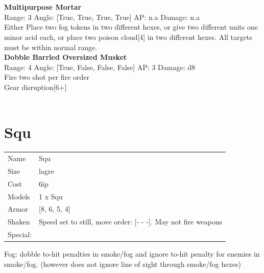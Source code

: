 \ \\

\ \\
{\bf Multipurpose Mortar } \\



Range: 3  Angle: [True, True, True, True] AP: n.a Damage: n.a \\
Either Place two fog tokens in two different hexes, or give two different units one minor acid each, or place two poison cloud[4] in two different hexes. All targets must be within normal range.\\ 




{\bf Dobble Barrled Oversized Musket } \\



Range: 4  Angle: [True, False, False, False] AP: 3 Damage: d8 \\
Fire two shot per fire order\\ 
Gear disruption[6+]\\ 




 
\ \\













\clearpage

\section{ Squ }

\begin{tabular}{ll}
  Name & Squ \\
  Size & lagre\\
  Cost & 6ip\\
  Models & 1 x Squ\\
  Armor & [8, 6, 5, 4]\\
  Shaken & Speed set to still, move order: [- - -]. May not fire weapons\\
  Special: \\
\end{tabular}

\noindent Fog: dobble to-hit penalties in smoke/fog and ignore to-hit penalty for enemies in smoke/fog. (however does not ignore line of sight through smoke/fog hexes)\\ 


